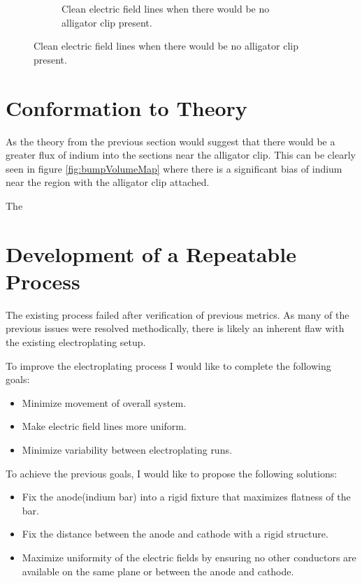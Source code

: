 \begin{figure}
\begin{subfigure}[t]{0.45\textwidth}
        \caption{Clean electric field lines when there would be no alligator clip present.}
    \end{subfigure}
    \label{fig:field_lines}
\end{figure}


\section{Conformation to Theory}
As the theory from the previous section would suggest that there would be a greater flux of indium into the sections near the alligator clip. This can be clearly seen in figure \ref{fig:bumpVolumeMap} where there is a significant bias of indium near the region with the alligator clip attached.

The


\section{Development of a Repeatable Process}

The existing process failed after verification of previous metrics. As many of the previous issues were resolved methodically, there is likely an inherent flaw with the existing electroplating setup.

To improve the electroplating process I would like to complete the following goals:

\begin{itemize}
    \item Minimize movement of overall system.
    \item Make electric field lines more uniform.
    \item Minimize variability between electroplating runs.
\end{itemize}

To achieve the previous goals, I would like to propose the following solutions:

\begin{itemize}
    \item Fix the anode(indium bar) into a rigid fixture that maximizes flatness of the bar.
    \item Fix the distance between the anode and cathode with a rigid structure.
    \item Maximize uniformity of the electric fields by ensuring no other conductors are available on the same plane or between the anode and cathode.
\end{itemize}

